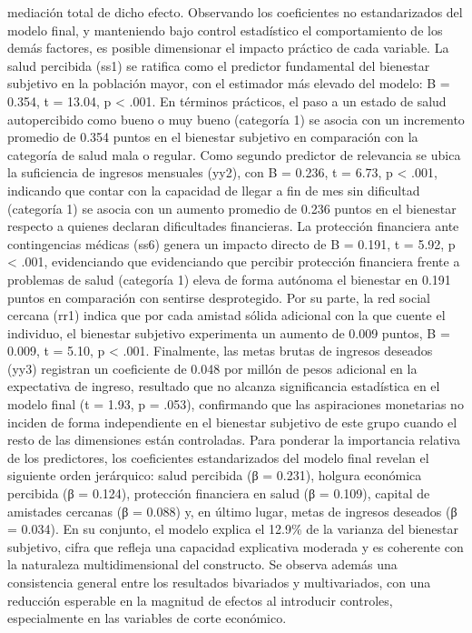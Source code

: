 \documentclass[
  spanish,
  a4paper,
  oneside]{scrbook}
\begin{document}
mediación total de dicho efecto. Observando los coeficientes no
estandarizados del modelo final, y manteniendo bajo control estadístico
el comportamiento de los demás factores, es posible dimensionar el
impacto práctico de cada variable. La salud percibida (ss1) se ratifica
como el predictor fundamental del bienestar subjetivo en la población
mayor, con el estimador más elevado del modelo: B = 0.354, t = 13.04, p
\textless{} .001. En términos prácticos, el paso a un estado de salud
autopercibido como bueno o muy bueno (categoría 1) se asocia con un
incremento promedio de 0.354 puntos en el bienestar subjetivo en
comparación con la categoría de salud mala o regular. Como segundo
predictor de relevancia se ubica la suficiencia de ingresos mensuales
(yy2), con B = 0.236, t = 6.73, p \textless{} .001, indicando que contar
con la capacidad de llegar a fin de mes sin dificultad (categoría 1) se
asocia con un aumento promedio de 0.236 puntos en el bienestar respecto
a quienes declaran dificultades financieras. La protección financiera
ante contingencias médicas (ss6) genera un impacto directo de B = 0.191,
t = 5.92, p \textless{} .001, evidenciando que evidenciando que percibir
protección financiera frente a problemas de salud (categoría 1) eleva de
forma autónoma el bienestar en 0.191 puntos en comparación con sentirse
desprotegido. Por su parte, la red social cercana (rr1) indica que por
cada amistad sólida adicional con la que cuente el individuo, el
bienestar subjetivo experimenta un aumento de 0.009 puntos, B = 0.009, t
= 5.10, p \textless{} .001. Finalmente, las metas brutas de ingresos
deseados (yy3) registran un coeficiente de 0.048 por millón de pesos
adicional en la expectativa de ingreso, resultado que no alcanza
significancia estadística en el modelo final (t = 1.93, p = .053),
confirmando que las aspiraciones monetarias no inciden de forma
independiente en el bienestar subjetivo de este grupo cuando el resto de
las dimensiones están controladas. Para ponderar la importancia relativa
de los predictores, los coeficientes estandarizados del modelo final
revelan el siguiente orden jerárquico: salud percibida (β = 0.231),
holgura económica percibida (β = 0.124), protección financiera en salud
(β = 0.109), capital de amistades cercanas (β = 0.088) y, en último
lugar, metas de ingresos deseados (β = 0.034). En su conjunto, el modelo
explica el 12.9\% de la varianza del bienestar subjetivo, cifra que
refleja una capacidad explicativa moderada y es coherente con la
naturaleza multidimensional del constructo. Se observa además una
consistencia general entre los resultados bivariados y multivariados,
con una reducción esperable en la magnitud de efectos al introducir
controles, especialmente en las variables de corte económico.
\end{document}
